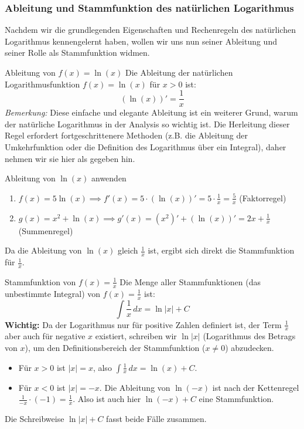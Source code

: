 \subsubsection{Ableitung und Stammfunktion des natürlichen Logarithmus}
\label{subsubsec:ableitung_stammfunktion_lnx}

Nachdem wir die grundlegenden Eigenschaften und Rechenregeln des natürlichen Logarithmus kennengelernt haben, wollen wir uns nun seiner Ableitung und seiner Rolle als Stammfunktion widmen.

\begin{merksatzumgebung}{Ableitung von \texorpdfstring{$f(x) = \ln(x)$}{f(x) = ln(x)}}
Die Ableitung der natürlichen Logarithmusfunktion $f(x) = \ln(x)$ für $x > 0$ ist:
\[ (\ln(x))' = \frac{1}{x} \]
\textit{Bemerkung:} Diese einfache und elegante Ableitung ist ein weiterer Grund, warum der natürliche Logarithmus in der Analysis so wichtig ist. Die Herleitung dieser Regel erfordert fortgeschrittenere Methoden (z.B. die Ableitung der Umkehrfunktion oder die Definition des Logarithmus über ein Integral), daher nehmen wir sie hier als gegeben hin.
\end{merksatzumgebung}

\begin{beispielumgebung}{Ableitung von \texorpdfstring{$\ln(x)$}{ln(x)} anwenden}
\begin{enumerate}
    \item $f(x) = 5\ln(x) \implies f'(x) = 5 \cdot (\ln(x))' = 5 \cdot \frac{1}{x} = \frac{5}{x}$ (Faktorregel)
    \item $g(x) = x^2 + \ln(x) \implies g'(x) = (x^2)' + (\ln(x))' = 2x + \frac{1}{x}$ (Summenregel)
\end{enumerate}
\end{beispielumgebung}

Da die Ableitung von $\ln(x)$ gleich $\frac{1}{x}$ ist, ergibt sich direkt die Stammfunktion für $\frac{1}{x}$.

\begin{merksatzumgebung}{Stammfunktion von \texorpdfstring{$f(x) = \frac{1}{x}$}{f(x) = 1/x}}
Die Menge aller Stammfunktionen (das unbestimmte Integral) von $f(x) = \frac{1}{x}$ ist:
\[ \int \frac{1}{x} \,dx = \ln|x| + C \]
\textbf{Wichtig:} Da der Logarithmus nur für positive Zahlen definiert ist, der Term $\frac{1}{x}$ aber auch für negative $x$ existiert, schreiben wir $\ln|x|$ (Logarithmus des Betrags von $x$), um den Definitionsbereich der Stammfunktion ($x \neq 0$) abzudecken.
\begin{itemize}
    \item Für $x > 0$ ist $|x|=x$, also $\int \frac{1}{x} \,dx = \ln(x) + C$.
    \item Für $x < 0$ ist $|x|=-x$. Die Ableitung von $\ln(-x)$ ist nach der Kettenregel $\frac{1}{-x} \cdot (-1) = \frac{1}{x}$. Also ist auch hier $\ln(-x)+C$ eine Stammfunktion.
\end{itemize}
Die Schreibweise $\ln|x|+C$ fasst beide Fälle zusammen.
\end{merksatzumgebung}

